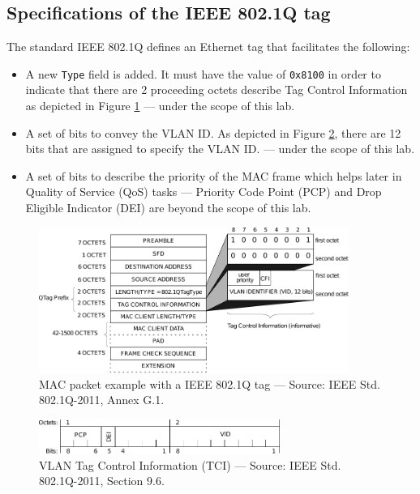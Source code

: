 \documentclass[pdftex,12pt,a4paper]{article}
\begin{document}
        \subsection{Specifications of the IEEE 802.1Q tag}
            The standard IEEE 802.1Q defines an Ethernet tag that facilitates the
            following:
            \begin{itemize}
                \item A new \texttt{Type} field is added. It must have the value of
                    \texttt{0x8100} in order to indicate that there are 2
                    proceeding octets describe Tag Control Information as
                    depicted in Figure \ref{fig:macpacket} --- under the scope
                    of this lab.
                \item A set of bits to convey the VLAN ID. As depicted in Figure
                    \ref{fig:dot1q}, there are 12 bits that are assigned to
                    specify the VLAN ID.  --- under the scope of this lab.
                \item A set of bits to describe the priority of the MAC frame
                    which helps later in Quality of Service (QoS) tasks ---
                    Priority Code Point (PCP) and Drop Eligible Indicator (DEI) are
                    beyond the scope of this lab.
            \end{itemize}
            
            \begin{figure}[tbh]
                \centering
                \includegraphics[width=0.9\textwidth]{figures/macpacket}
                \caption{MAC packet example with a IEEE 802.1Q tag --- Source: IEEE Std.
                802.1Q-2011, Annex G.1.}
                \label{fig:macpacket}
            \end{figure}

            \begin{figure}[tbh]
                \centering
                \includegraphics[width=0.7\textwidth]{figures/dot1q}
                \caption{VLAN Tag Control Information (TCI) --- Source: IEEE Std.
                802.1Q-2011, Section 9.6.}
                \label{fig:dot1q}
            \end{figure}
\end{document}
